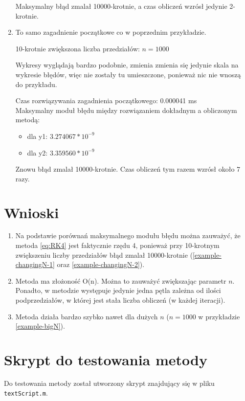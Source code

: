\documentclass[12pt]{article}
\begin{document}
\begin{enumerate}[label=\textbf{Przykład \arabic*}]
		Maksymalny błąd zmalał 10000-krotnie, a czas obliczeń wzrósł jedynie 2-krotnie.
		
		\item
		\label{example-bigN}
		
		To samo zagadnienie początkowe co w poprzednim przykładzie.
		
		10-krotnie zwiększona liczba przedziałów: $n = 1000$
		
		Wykresy wyglądają bardzo podobnie, zmienia zmienia się jedynie skala na wykresie błędów, więc nie zostały tu umieszczone, ponieważ nic nie wnoszą do przykładu.
		
		Czas rozwiązywania zagadnienia początkowego: 0.000041 ms\\
		Maksymalny moduł błędu między rozwiązaniem dokładnym a obliczonym metodą:
		\begin{itemize}
			\item dla y1: $3.274067 * 10^{-9}$
			\item dla y2: $3.359560 * 10^{-9}$
		\end{itemize}
		
		Znowu błąd zmalał 10000-krotnie. Czas obliczeń tym razem wzrósł około 7 razy.
	\end{enumerate}
	
	
	
	
	\section{Wnioski}
	\begin{enumerate}
		\item
		Na podstawie porównań maksymalnego modułu błędu można zauważyć, że metoda \eqref{eq:RK4} jest faktycznie rzędu 4, ponieważ przy 10-krotnym zwiększeniu liczby przedziałów błąd zmalał 10000-krotnie (\ref{example-changingN-1} oraz \ref{example-changingN-2}).
		
		\item
		Metoda ma złożoność O(n). Można to zauważyć zwiększając parametr $n$. Ponadto, w metodzie występuje jedynie jedna pętla zależna od ilości podprzedziałów, w której jest stała liczba obliczeń (w każdej iteracji).
		
		\item
		Metoda działa bardzo szybko nawet dla dużych $n$ ($n = 1000$ w przykładzie \ref{example-bigN}).
	\end{enumerate}
	
	
	
	\section{Skrypt do testowania metody}
	\label{sec:testing-script}
	Do testowania metody został utworzony skrypt znajdujący się w pliku \texttt{textScript.m}.
	
\end{document}
